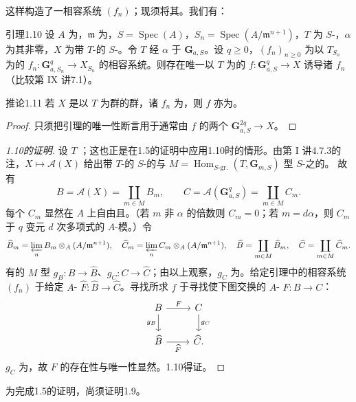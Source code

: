 这样构造了一相容系统 $(f_n)$；现须将其。我们有：
\begin{SGAresult}{引理}{1.10}
设 $A$ 为，$\mathfrak m$ 为，$S=\operatorname{Spec}(A)$，$S_n=\operatorname{Spec}(A/\mathfrak m^{n+1})$，$T$ 为 $S$-，$\alpha$ 为其非零，$X$ 为带 $T$-的 $S$-。令 $T$ 经 $\alpha$ 于 $\mathbf G_{a,S}$。设 $q\geq0$，$(f_n)_{n\geq0}$ 为以 $T_{S_n}$ 为的 $f_n:\mathbf G_{a,S_n}^q\to X_{S_n}$ 的相容系统。则存在唯一以 $T$ 为的 $f:\mathbf G_{a,S}^q\to X$ 诱导诸 $f_n$（比较第 IX 讲7.1）。
\end{SGAresult}
\begin{SGAresult}{推论}{1.11}
若 $X$ 是以 $T$ 为群的群，诸 $f_n$ 为，则 $f$ 亦为。
\end{SGAresult}
\begin{proof}只须把引理的唯一性断言用于通常由 $f$ 的两个 $\mathbf G_{a,S}^{2q}\to X$。\end{proof}
\begin{proof}[1.10的证明]
设 $T$ ；这也正是在1.5的证明中应用1.10时的情形。由第 I 讲4.7.3的注，$X\mapsto\mathscr A(X)$ 给出带 $T$-的 $S$-的与 $M=\operatorname{Hom}_{S\text{-gr.}}(T,\mathbf G_{m,S})$ 型 $S$-之的。
故有
\[B=\mathscr A(X)=\coprod_{m\in M}B_m,\qquad C=\mathscr A(\mathbf G_{a,S}^q)=\coprod_{m\in M}C_m.\]
每个 $C_m$ 显然在 $A$ 上自由且。（若 $m$ 非 $\alpha$ 的倍数则 $C_m=0$；若 $m=d\alpha$，则 $C_m$ 于 $q$ 变元 $d$ 次多项式的 $A$-模。）令
\[\widehat B_m=\varprojlim_n B_m\otimes_A(A/\mathfrak m^{n+1}),\quad\widehat C_m=\varprojlim_n C_m\otimes_A(A/\mathfrak m^{n+1}),\quad\widehat B=\coprod_{m\in M}\widehat B_m,\quad\widehat C=\coprod_{m\in M}\widehat C_m.\]
有的 $M$ 型 $g_B:B\to\widehat B$、$g_C:C\to\widehat C$；由以上观察，$g_C$ 为。给定引理中的相容系统 $(f_n)$ 于给定 $A$- $\widehat F:\widehat B\to\widehat C$。寻找所求 $f$ 于寻找使下图交换的 $A$- $F:B\to C$：
\[\begin{tikzcd}B\arrow[r,"F"]\arrow[d,"g_B"']&C\arrow[d,"g_C"]\\\widehat B\arrow[r,"\widehat F"']&\widehat C.\end{tikzcd}\]
$g_C$ 为，故 $F$ 的存在性与唯一性显然。1.10得证。
\end{proof}
为完成1.5的证明，尚须证明1.9。

